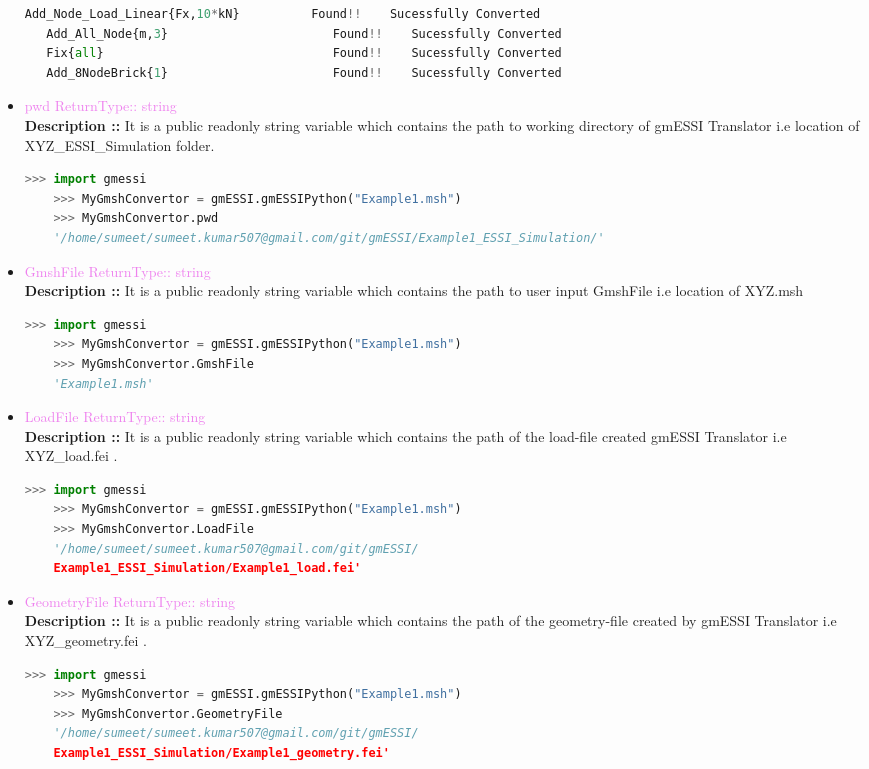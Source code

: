 \documentclass[11pt]{article}
\begin{document}
\begin{itemize}
\begin{lstlisting}[language=Python]
   Add_Node_Load_Linear{Fx,10*kN}          Found!!    Sucessfully Converted
   Add_All_Node{m,3}                       Found!!    Sucessfully Converted
   Fix{all}                                Found!!    Sucessfully Converted
   Add_8NodeBrick{1}                       Found!!    Sucessfully Converted

    \end{lstlisting}

    \item \textcolor{violet}{pwd \hfill {ReturnType:: string}} \\
    \textbf{Description ::} It is a public readonly string variable which contains the path to working directory of gmESSI Translator i.e location of XYZ\_ESSI\_Simulation folder. 
    \begin{lstlisting}[language=Python]
    >>> import gmessi
    >>> MyGmshConvertor = gmESSI.gmESSIPython("Example1.msh")
    >>> MyGmshConvertor.pwd
    '/home/sumeet/sumeet.kumar507@gmail.com/git/gmESSI/Example1_ESSI_Simulation/'
    \end{lstlisting}

    \item \textcolor{violet}{GmshFile \hfill {ReturnType:: string}} \\
    \textbf{Description ::} It is a public readonly string variable which contains the path to user input GmshFile i.e location of XYZ.msh 
    \begin{lstlisting}[language=Python]
    >>> import gmessi
    >>> MyGmshConvertor = gmESSI.gmESSIPython("Example1.msh")
    >>> MyGmshConvertor.GmshFile
    'Example1.msh'
    \end{lstlisting}

    \item \textcolor{violet}{LoadFile \hfill {ReturnType:: string}} \\
    \textbf{Description ::} It is a public readonly string variable which contains the path of the load-file created gmESSI Translator i.e XYZ\_load.fei . 
    \begin{lstlisting}[language=Python]
    >>> import gmessi
    >>> MyGmshConvertor = gmESSI.gmESSIPython("Example1.msh")
    >>> MyGmshConvertor.LoadFile
    '/home/sumeet/sumeet.kumar507@gmail.com/git/gmESSI/
    Example1_ESSI_Simulation/Example1_load.fei'
    \end{lstlisting}

    \item \textcolor{violet}{GeometryFile \hfill {ReturnType:: string}} \\
    \textbf{Description ::} It is a public readonly string variable which contains the path of the geometry-file created by gmESSI Translator i.e XYZ\_geometry.fei . 
    \begin{lstlisting}[language=Python]
    >>> import gmessi
    >>> MyGmshConvertor = gmESSI.gmESSIPython("Example1.msh")
    >>> MyGmshConvertor.GeometryFile
    '/home/sumeet/sumeet.kumar507@gmail.com/git/gmESSI/
    Example1_ESSI_Simulation/Example1_geometry.fei'
    \end{lstlisting}


\end{itemize}
\end{document}
